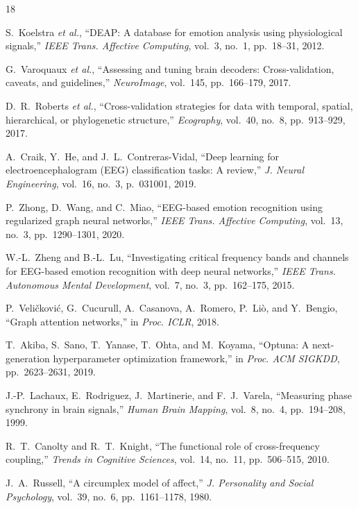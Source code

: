 \documentclass[a4paper, 10pt, conference]{ieeeconf}
\begin{document}
\begin{thebibliography}{18}

S.~Koelstra \emph{et al.}, ``DEAP: A database for emotion analysis using physiological signals,'' \emph{IEEE Trans. Affective Computing}, vol.~3, no.~1, pp.~18--31, 2012.

G.~Varoquaux \emph{et al.}, ``Assessing and tuning brain decoders: Cross-validation, caveats, and guidelines,'' \emph{NeuroImage}, vol.~145, pp.~166--179, 2017.

D.~R.~Roberts \emph{et al.}, ``Cross-validation strategies for data with temporal, spatial, hierarchical, or phylogenetic structure,'' \emph{Ecography}, vol.~40, no.~8, pp.~913--929, 2017.

A.~Craik, Y.~He, and J.~L.~Contreras-Vidal, ``Deep learning for electroencephalogram (EEG) classification tasks: A review,'' \emph{J. Neural Engineering}, vol.~16, no.~3, p.~031001, 2019.

P.~Zhong, D.~Wang, and C.~Miao, ``EEG-based emotion recognition using regularized graph neural networks,'' \emph{IEEE Trans. Affective Computing}, vol.~13, no.~3, pp.~1290--1301, 2020.

W.-L.~Zheng and B.-L.~Lu, ``Investigating critical frequency bands and channels for EEG-based emotion recognition with deep neural networks,'' \emph{IEEE Trans. Autonomous Mental Development}, vol.~7, no.~3, pp.~162--175, 2015.

P.~Veli\v{c}kovi\'{c}, G.~Cucurull, A.~Casanova, A.~Romero, P.~Li\`{o}, and Y.~Bengio, ``Graph attention networks,'' in \emph{Proc. ICLR}, 2018.

T.~Akiba, S.~Sano, T.~Yanase, T.~Ohta, and M.~Koyama, ``Optuna: A next-generation hyperparameter optimization framework,'' in \emph{Proc. ACM SIGKDD}, pp.~2623--2631, 2019.

J.-P.~Lachaux, E.~Rodriguez, J.~Martinerie, and F.~J.~Varela, ``Measuring phase synchrony in brain signals,'' \emph{Human Brain Mapping}, vol.~8, no.~4, pp.~194--208, 1999.

\nopagebreak
R.~T.~Canolty and R.~T.~Knight, ``The functional role of cross-frequency coupling,'' \emph{Trends in Cognitive Sciences}, vol.~14, no.~11, pp.~506--515, 2010.

\nopagebreak
J.~A.~Russell, ``A circumplex model of affect,'' \emph{J. Personality and Social Psychology}, vol.~39, no.~6, pp.~1161--1178, 1980.


\end{thebibliography}
\end{document}

